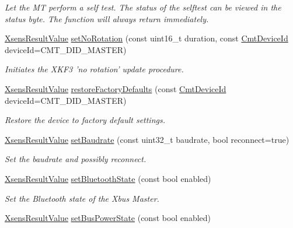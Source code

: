 \begin{DoxyCompactItemize}
\begin{DoxyCompactList}\small\item\em \-Let the \-M\-T perform a self test. \-The status of the selftest can be viewed in the status byte. \-The function will always return immediately. \end{DoxyCompactList}\item 
\hyperlink{group__enums_ga822a2260a20af524029eef9e9a51ff6f}{\-Xsens\-Result\-Value} \hyperlink{classxsens_1_1Cmt3_a69c6d8e1b1e64411c77df3c245ee1408}{set\-No\-Rotation} (const uint16\-\_\-t duration, const \hyperlink{cmtdef_8h_a2e3b6a17360828d440ee848959918af2}{\-Cmt\-Device\-Id} device\-Id=\-C\-M\-T\-\_\-\-D\-I\-D\-\_\-\-M\-A\-S\-T\-E\-R)
\begin{DoxyCompactList}\small\item\em \-Initiates the \-X\-K\-F3 'no rotation' update procedure. \end{DoxyCompactList}\item 
\hyperlink{group__enums_ga822a2260a20af524029eef9e9a51ff6f}{\-Xsens\-Result\-Value} \hyperlink{classxsens_1_1Cmt3_a7185111f5e20781297c092af18c59b3d}{restore\-Factory\-Defaults} (const \hyperlink{cmtdef_8h_a2e3b6a17360828d440ee848959918af2}{\-Cmt\-Device\-Id} device\-Id=\-C\-M\-T\-\_\-\-D\-I\-D\-\_\-\-M\-A\-S\-T\-E\-R)
\begin{DoxyCompactList}\small\item\em \-Restore the device to factory default settings. \end{DoxyCompactList}\item 
\hyperlink{group__enums_ga822a2260a20af524029eef9e9a51ff6f}{\-Xsens\-Result\-Value} \hyperlink{classxsens_1_1Cmt3_a078e78847110f58bf2ccd0cfb4a6db8c}{set\-Baudrate} (const uint32\-\_\-t baudrate, bool reconnect=true)
\begin{DoxyCompactList}\small\item\em \-Set the baudrate and possibly reconnect. \end{DoxyCompactList}\item 
\hyperlink{group__enums_ga822a2260a20af524029eef9e9a51ff6f}{\-Xsens\-Result\-Value} \hyperlink{classxsens_1_1Cmt3_a2c3b390662d41fa22eff650c882e3ac7}{set\-Bluetooth\-State} (const bool enabled)
\begin{DoxyCompactList}\small\item\em \-Set the \-Bluetooth state of the \-Xbus \-Master. \end{DoxyCompactList}\item 
\hyperlink{group__enums_ga822a2260a20af524029eef9e9a51ff6f}{\-Xsens\-Result\-Value} \hyperlink{classxsens_1_1Cmt3_a170256e8033a34aef6c732be5e069c4a}{set\-Bus\-Power\-State} (const bool enabled)

\end{DoxyCompactItemize}
